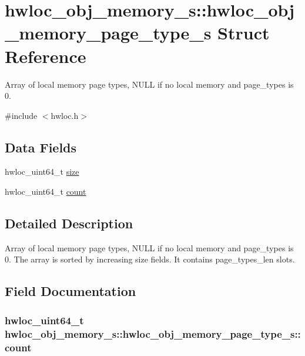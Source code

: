 \hypertarget{a00019}{
\section{hwloc\_\-obj\_\-memory\_\-s::hwloc\_\-obj\_\-memory\_\-page\_\-type\_\-s Struct Reference}
\label{a00019}
}


Array of local memory page types, {\ttfamily NULL} if no local memory and {\ttfamily page\_\-types} is 0.  




{\ttfamily \#include $<$hwloc.h$>$}

\subsection*{Data Fields}
\begin{DoxyCompactItemize}
\item 
hwloc\_\-uint64\_\-t \hyperlink{a00019_a3f1d261766352288791512974665ce01}{size}
\item 
hwloc\_\-uint64\_\-t \hyperlink{a00019_aa5b9fa36f1dc47ff3c345fe4dd06b260}{count}
\end{DoxyCompactItemize}


\subsection{Detailed Description}
Array of local memory page types, {\ttfamily NULL} if no local memory and {\ttfamily page\_\-types} is 0. The array is sorted by increasing {\ttfamily size} fields. It contains {\ttfamily page\_\-types\_\-len} slots. 

\subsection{Field Documentation}
\hypertarget{a00019_aa5b9fa36f1dc47ff3c345fe4dd06b260}{
\subsubsection[{count}]{\setlength{\rightskip}{0pt plus 5cm}hwloc\_\-uint64\_\-t {\bf hwloc\_\-obj\_\-memory\_\-s::hwloc\_\-obj\_\-memory\_\-page\_\-type\_\-s::count}}}
\label{a00019_aa5b9fa36f1dc47ff3c345fe4dd06b260}


